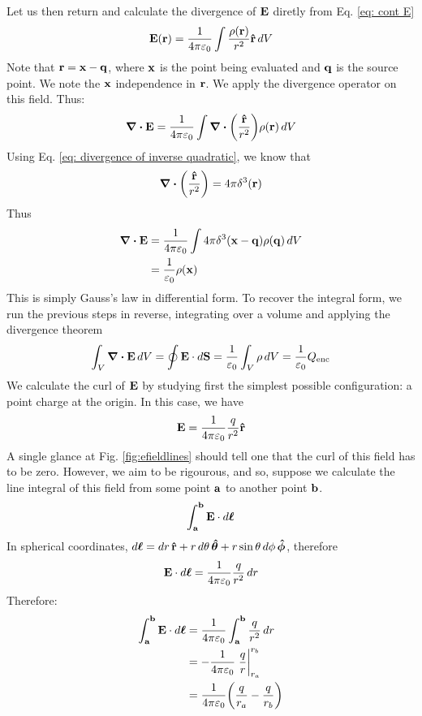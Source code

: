 			Let us then return and calculate the divergence of $\vb E$ diretly from Eq. \ref{eq: cont E}
			\begin{equation}
				\vb{E}(\vb r) = \frac{1}{4\pi\varepsilon_0}\int \frac{\rho(\vb{r})}{r^2}\vu{r}\dd{V}  
			\end{equation}
			Note that $\vb{r} = \vb{x} - \vb{q}$, where $\vb{x}$ is the point being evaluated and $\vb{q}$ is the
			source point. We note the $\vb{x}$ independence in $\vb{r}$. We apply the divergence operator on this field. Thus:
			\begin{equation}
				\div \vb E
				= 
				\frac{1}{4\pi\varepsilon_0}\int\div\pqty{\frac{\vu{r}}{r^2}}\rho(\vb r)\dd{V} 
			\end{equation}
			Using Eq. \ref{eq: divergence of inverse quadratic}, we know that
			\[
				\div(\frac{\vu{r}}{r^2}) = 4\pi\delta^3(\vb{r})
			\]
			Thus
			\begin{align*}
				\div\vb E 
				&= \frac{1}{4\pi\varepsilon_0}\int 4\pi\delta^3(\vb x - \vb q) \rho(\vb q) \dd{V} \\
				&= \frac{1}{\varepsilon_0}\rho(\vb{x}) 
			\end{align*}
			This is simply Gauss's law in differential form. To recover the integral form, we run the 
			previous steps in reverse, integrating over a volume and applying the divergence theorem
			\begin{equation}
				\int_V \div \vb{E}\dd{V} = \oint \vb{E}\cdot \dd{\vb S} = \frac{1}{\varepsilon_0} \int_V \rho \dd{V} = \frac{1}{\varepsilon_0} Q_\text{enc}  
			\end{equation}
			We calculate the curl of $\vb E$ by studying first the simplest possible configuration: a point 
			charge at the origin. In this case, we have
			\[
				\vb{ E } = \frac{1}{4\pi\varepsilon_0} \frac{q}{r^2}\vu{r} 
			\]
			A single glance at Fig. \ref{fig:efieldlines} should tell one that the curl of this field 
			has to be zero. However, we aim to be rigourous, and so, suppose we calculate the 
			line integral of this field from some point $\vb a$ to another point $\vb b$. 
			\[
				\int_{\vb{a}}^{\vb{b}} \vb{E}\cdot\dd{\vb*{\ell}}
			\]
			In spherical coordinates, $\dd{\vb* \ell}=\dd{r}\vu{r}+ r\dd{\theta}\vu*{\theta}+r\sin\theta\dd{\phi}\vu*{\phi}$, therefore
			\[
				\vb{E}\cdot\dd{\vb* \ell} = \frac{1}{4\pi\varepsilon_0}\frac{q}{r^2}\dd{r} 
			\]
			Therefore:
			\begin{align*}
			    \int_{\vb a}^{\vb b}\vb{E}\cdot\dd{\vb* \ell}
				&= \frac{1}{4\pi\epsz} \int_{\vb a}^{\vb b} \frac{q}{r^2}\dd{r}\\
				&= -\frac{1}{4\pi\epsz}\eval{\frac{q}{r}}_{r_a}^{r_b}\\
				&= \frac{1}{4\pi\epsz}\pqty{
					\frac{q}{r_a}
					-
					\frac{q}{r_b} 
				} 
			\end{align*}

